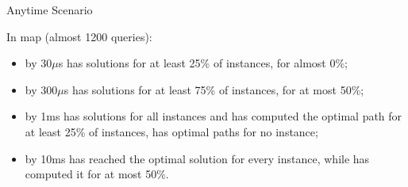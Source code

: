 \begin{frame}{Anytime Scenario}

    In  map (almost 1200 queries):

    \begin{itemize}
        \item by 30$\mu$s \anytimeCPDSearch{} has solutions for at least 25\% of instances, \AWA{} for almost 0\%;
        \medskip
        \item by 300$\mu$s \anytimeCPDSearch{} has solutions for at least 75\% of instances, \AWA{} for at most 50\%;
        \medskip
        \item by 1ms \anytimeCPDSearch{} has solutions for all instances and has computed the optimal path for at least 25\% of instances, \AWA{} has optimal paths for no instance;
        \medskip
        \item by 10ms \anytimeCPDSearch{} has reached the optimal solution for every instance, while \AWA{} has computed it for at most 50\%.
    \end{itemize}
\end{frame}
